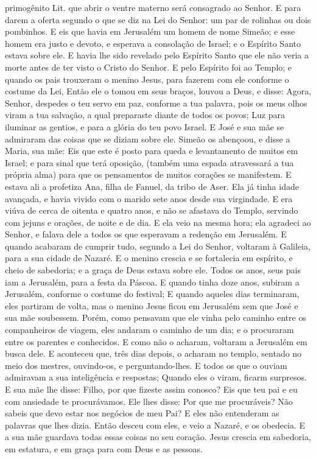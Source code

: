 {{primogênito
Lit. que abrir o ventre materno
} será consagrado ao Senhor.
{}
  E para darem a oferta segundo o que se diz na Lei do Senhor: um par de rolinhas ou dois pombinhos.
  E eis que havia em Jerusalém um homem de nome Simeão; e esse homem era justo e devoto, e esperava a consolação de Israel; e o Espírito Santo estava sobre ele.
  E havia lhe sido revelado pelo Espírito Santo que ele não veria a morte antes de ter visto o Cristo do Senhor.
  E pelo Espírito foi ao Templo; e quando os pais trouxeram o menino Jesus, para fazerem com ele conforme o costume da Lei,
  Então ele o tomou em seus braços, louvou a Deus, e disse:
  Agora, Senhor, despedes o teu servo em paz, conforme a tua palavra,
  pois os meus olhos viram a tua salvação,
  a qual preparaste diante de todos os povos;
  Luz para iluminar as gentios, e para a glória do teu povo Israel.
  E José e sua mãe se admiraram das coisas que se diziam sobre ele.
  Simeão os abençoou, e disse a Maria, sua mãe: Eis que este é posto para queda e levantamento de muitos em Israel; e para sinal que terá oposição,
  (também uma espada atravessará a tua própria alma) para que os pensamentos de muitos corações se manifestem.
  E estava ali a profetiza Ana, filha de Fanuel, da tribo de Aser. Ela já tinha idade avançada, e havia vivido com o marido sete anos desde sua virgindade.
  E era viúva de cerca de oitenta e quatro anos, e não se afastava do Templo, servindo
{} com jejuns e orações, de noite e de dia.
  E ela veio na mesma hora; ela agradeci ao Senhor, e falava dele a todos os que esperavam a redenção em Jerusalém.
  E quando acabaram de cumprir tudo, segundo a Lei do Senhor, voltaram à Galileia, para a sua cidade de Nazaré.
  E o menino crescia e se fortalecia em espírito, e cheio de sabedoria; e a graça de Deus estava sobre ele.
  Todos os anos, seus pais iam a Jerusalém, para a festa da Páscoa.
  E quando
{} tinha doze anos, subiram a Jerusalém, conforme o costume do festival;
  E quando aqueles dias terminaram, eles partiram de volta, mas o menino Jesus ficou em Jerusalém sem que José e sua mãe soubessem.
  Porém, como pensavam que ele vinha pelo caminho entre os companheiros de viagem, eles andaram o caminho de um dia; e o procuraram entre os parentes e conhecidos.
  E como não o acharam, voltaram a Jerusalém em busca dele.
  E aconteceu que, três dias depois, o acharam no templo, sentado no meio dos mestres, ouvindo-os, e perguntando-lhes.
  E todos os que o ouviam admiravam a sua inteligência e respostas;
  Quando eles o viram, ficarm surpresos. E sua mãe lhe disse: Filho, por que fizeste assim conosco? Eis que teu pai e eu com ansiedade te procurávamos.
  Ele lhes disse: Por que me procuráveis? Não sabeis que devo estar nos negócios de meu Pai?
  E eles não entenderam as palavras que lhes dizia.
  Então desceu com eles, e veio a Nazaré, e os obedecia. E a sua mãe guardava todas essas coisas no seu coração.
  Jesus crescia em sabedoria, em estatura, e em graça para com Deus e as pessoas.
\par }

